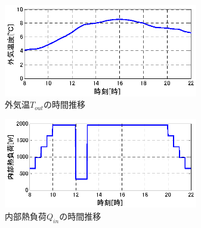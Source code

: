 \begin{figure}[ht]
  \begin{center}
    \includegraphics[width=85mm]{fig/math_outside_temp.eps}
  \end{center}
  \caption{外気温$T_{out}$の時間推移}
  \label{fig::math_outside_temp}
\end{figure}
\begin{figure}[ht]
  \begin{center}
    \includegraphics[width=85mm]{fig/math_internal_heatload.eps}
  \end{center}
  \caption{内部熱負荷$Q_{in}$の時間推移}
  \label{fig::math_internal_heatload}
\end{figure}

